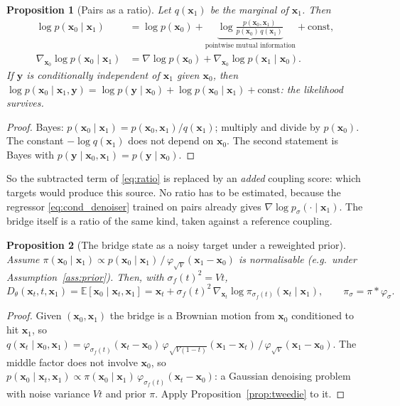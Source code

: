 \documentclass[11pt]{article}
\newtheorem{proposition}{Proposition}
\theoremstyle{definition}
\theoremstyle{remark}
\newcommand{\x}{\bm{x}}
\newcommand{\y}{\bm{y}}
\newcommand{\E}{\mathbb{E}}
\newcommand{\D}{D_\theta}
\newcommand{\grad}{\nabla}
\begin{document}
\begin{proposition}[Pairs as a ratio]\label{prop:pmi}
Let $q(\x_1)$ be the marginal of $\x_1$. Then
\begin{align}
  \log p(\x_0\mid\x_1) &= \log p(\x_0)
  + \underbrace{\log\frac{p(\x_0,\x_1)}{p(\x_0)\,q(\x_1)}}_{\text{pointwise mutual information}}
  + \mathrm{const},
  \label{eq:pmi}\\
  \grad_{\x_0}\log p(\x_0\mid\x_1) &= \grad\log p(\x_0) + \grad_{\x_0}\log p(\x_1\mid\x_0).
  \nonumber
\end{align}
If $\y$ is conditionally independent of $\x_1$ given $\x_0$, then
$\log p(\x_0\mid\x_1,\y) = \log p(\y\mid\x_0) + \log p(\x_0\mid\x_1) + \mathrm{const}$: the
likelihood survives.
\end{proposition}
\begin{proof}
Bayes: $p(\x_0\mid\x_1) = p(\x_0,\x_1)/q(\x_1)$; multiply and divide by $p(\x_0)$. The constant
$-\log q(\x_1)$ does not depend on $\x_0$. The second statement is Bayes with
$p(\y\mid\x_0,\x_1) = p(\y\mid\x_0)$.
\end{proof}

So the subtracted term of \eqref{eq:ratio} is replaced by an \emph{added} coupling score:
which targets would produce this source. No ratio has to be estimated, because the regressor
\eqref{eq:cond_denoiser} trained on pairs already gives $\grad\log p_\sigma(\cdot\mid\x_1)$.
The bridge itself is a ratio of the same kind, taken against a reference coupling.

\begin{proposition}[The bridge state as a noisy target under a reweighted prior]\label{prop:tilt}
Assume $\pi(\x_0\mid\x_1)\propto p(\x_0\mid\x_1)\,/\,\varphi_{\sqrt V}(\x_1-\x_0)$ is normalisable
(e.g.\ under Assumption~\ref{ass:prior}). Then, with $\sigma_f(t)^2 = Vt$,
\begin{equation}
  \D(\x_t,t,\x_1) = \E[\x_0\mid\x_t,\x_1]
  = \x_t + \sigma_f(t)^2\,\grad_{\x_t}\log\pi_{\sigma_f(t)}(\x_t\mid\x_1),
  \qquad \pi_\sigma = \pi * \varphi_\sigma .
  \label{eq:tilt}
\end{equation}
\end{proposition}
\begin{proof}
Given $(\x_0,\x_1)$ the bridge is a Brownian motion from $\x_0$ conditioned to hit $\x_1$, so
$q(\x_t\mid\x_0,\x_1) = \varphi_{\sigma_f(t)}(\x_t-\x_0)\,\varphi_{\sqrt{V(1-t)}}(\x_1-\x_t)
\,/\,\varphi_{\sqrt V}(\x_1-\x_0)$. The middle factor does not involve $\x_0$, so
$p(\x_0\mid\x_t,\x_1)\propto\pi(\x_0\mid\x_1)\,\varphi_{\sigma_f(t)}(\x_t-\x_0)$: a Gaussian
denoising problem with noise variance $Vt$ and prior $\pi$. Apply
Proposition~\ref{prop:tweedie} to it.
\end{proof}
\end{document}
